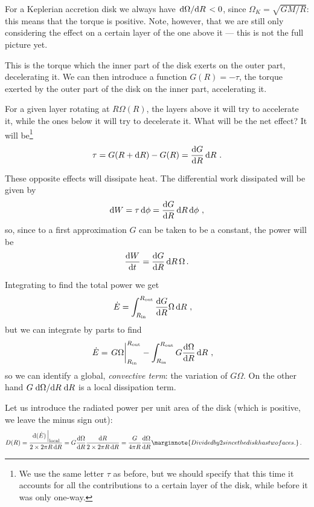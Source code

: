 \documentclass[main.tex]{subfiles}
\begin{document}
For a Keplerian accretion disk we always have \(\dv*{\Omega }{R} < 0\), since \(\Omega _K = \sqrt{GM / R}\): this means that the torque is positive.
Note, however, that we are still only considering the effect on a certain layer of the one above it --- this is not the full picture yet.

This is the torque which the inner part of the disk exerts on the outer part, decelerating it. 
We can then introduce a function \(G(R) = - \tau \), the torque exerted by the outer part of the disk on the inner part, accelerating it. 

For a given layer rotating at \(R \Omega (R)\), the layers above it will try to accelerate it, while the ones below it will try to decelerate it. What will be the net effect? It will be\footnote{We use the same letter \(\tau \) as before, but we should specify that this time it accounts for all the contributions to a certain layer of the disk, while before it was only one-way.}
%
\begin{align}
\tau =  G(R + \dd{R}) - G(R) = \dv{G}{R} \dd{R}
\,.
\end{align}

These opposite effects will dissipate heat. 
The differential work dissipated will be given by 
%
\begin{align}
\dd{W} = \tau \dd{\phi } = \dv{G}{R} \dd{R} \dd{\phi }
\,,
\end{align}
%
so, since to a first approximation \(G\) can be taken to be a constant, the power will be 
%
\begin{align}
\dv{W}{t} = \dv{G}{R} \dd{R} \Omega 
\,.
\end{align}

Integrating to find the total power we get
%
\begin{align}
\dot{E} &= \int_{R _{\text{in}}}^{R _{\text{out}} } \dv{G}{R} \Omega \dd{R} 
\,,
\end{align}
%
but we can integrate by parts to find 
%
\begin{align}
\dot{E} &= \eval{G \Omega }_{R _{\text{in}}}^{R _{\text{out}}}
- \int_{R _{\text{in}}}^{R _{\text{out}}} G \dv{\Omega }{R} \dd{R} 
\,,
\end{align}
%
so we can identify a global, \emph{convective term}: the variation of \(G \Omega \). On the other hand \(G \dv*{\Omega }{R} \dd{R}\) is a local dissipation term. 

Let us introduce the radiated power per unit area of the disk (which is positive, we leave the minus sign out):
%
\begin{align}
D(R) = \frac{ \eval{\dd{(\dot{E})}}_{\text{local}}}{2 \times 2 \pi R \dd{R}}
&= G \dv{\Omega }{R} \frac{ \dd{R}}{2 \times 2 \pi R \dd{R}} = \frac{G}{4 \pi R} \dv{\Omega }{R} \marginnote{Divided by 2 since the disk has two faces.} 
\,.
\end{align}
\end{document}
